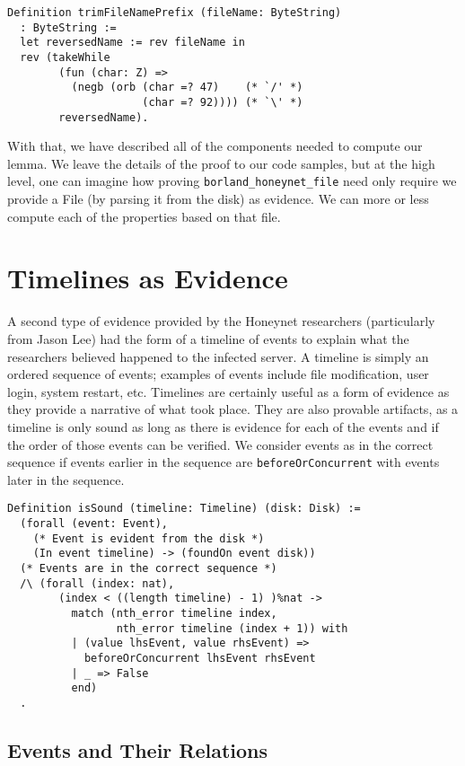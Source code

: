 \documentclass[nocopyrightspace]{sigplanconf}
\begin{document}
\begin{lstlisting}
Definition trimFileNamePrefix (fileName: ByteString)
  : ByteString :=
  let reversedName := rev fileName in
  rev (takeWhile 
        (fun (char: Z) => 
          (negb (orb (char =? 47)    (* `/' *)
                     (char =? 92)))) (* `\' *)
        reversedName).
\end{lstlisting}

With that, we have described all of the components needed to compute our
lemma. We leave the details of the proof to our code samples, but at the high
level, one can imagine how proving {\tt borland\_honeynet\_file} need only
require we provide a File (by parsing it from the disk) as evidence. We can
more or less compute each of the properties based on that file.

\section{Timelines as Evidence}

A second type of evidence provided by the Honeynet researchers (particularly
from Jason Lee\cite{lee}) had the form of a timeline of events to explain
what the researchers believed happened to the infected server. A timeline is
simply an ordered sequence of events; examples of events include file
modification, user login, system restart, etc. Timelines are certainly useful
as a form of evidence as they provide a narrative of what took place. They are
also provable artifacts, as a timeline is only sound as long as there is
evidence for each of the events and if the order of those events can be
verified. We consider events as in the correct sequence if events earlier in
the sequence are {\tt beforeOrConcurrent} with events later in the sequence.

\begin{lstlisting}
Definition isSound (timeline: Timeline) (disk: Disk) :=
  (forall (event: Event),
    (* Event is evident from the disk *)
    (In event timeline) -> (foundOn event disk))
  (* Events are in the correct sequence *)
  /\ (forall (index: nat),
        (index < ((length timeline) - 1) )%nat ->
          match (nth_error timeline index,
                 nth_error timeline (index + 1)) with
          | (value lhsEvent, value rhsEvent) => 
            beforeOrConcurrent lhsEvent rhsEvent
          | _ => False
          end)
  .
\end{lstlisting}

\subsection{Events and Their Relations}
\end{document}
